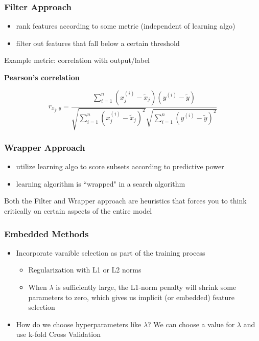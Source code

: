 \documentclass[12pt]{article}
\begin{document}
\subsubsection{Filter Approach}
\begin{itemize}
	\item rank features according to some metric (independent of learning algo)
	\item filter out features that fall below a certain threshold
\end{itemize}

Example metric: correlation with output/label

\textbf{Pearson's correlation}

\[  
	r_{x_j, y} = \frac {\sum_{i=1}^n (x_j^{(i)} - \tilde x_j)(y^{(i)} - \tilde y)} {\sqrt{\sum_{i = 1}^n (x_j^{(i)} - \tilde x_j)^2} \sqrt{\sum_{i=1}^n (y^{(i)} - \tilde y) ^2}} 
\]

\subsubsection{Wrapper Approach}
\begin{itemize}
	\item utilize learning algo to score subsets according to predictive power
	\item learning algorithm is ``wrapped" in a search algorithm
\end{itemize}

Both the Filter and Wrapper approach are heuristics that forces you to think critically on certain aspects of the entire model

\subsubsection{Embedded Methods}
\begin{itemize}
	\item Incorporate varaible selection as part of the training process
		\begin{itemize}
			\item Regularization with L1 or L2 norms
			\item When $\lambda$ is sufficiently large, the L1-norm penalty will shrink some parameters to zero, which gives us implicit (or embedded) feature selection
		\end{itemize}
	\item How do we choose hyperparameters like $\lambda$? We can choose a value for $\lambda$ and use k-fold Cross Validation
\end{itemize}
\end{document}
